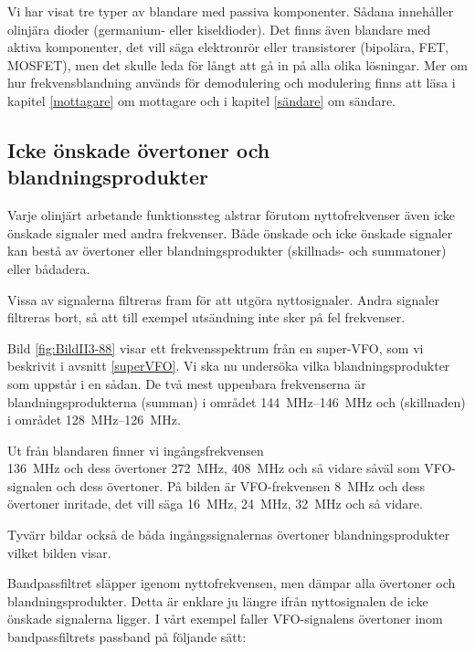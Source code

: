 Vi har visat tre typer av blandare med passiva komponenter.
Sådana innehåller olinjära dioder (germanium- eller kiseldioder).
Det finns även blandare med aktiva komponenter, det vill säga elektronrör eller
transistorer (bipolära, FET, MOSFET), men det skulle leda för långt
att gå in på alla olika lösningar.
Mer om hur frekvensblandning används för demodulering och modulering finns att
läsa i kapitel \ref{mottagare} om mottagare och i kapitel \ref{sändare} om
sändare.

\subsection{Icke önskade övertoner och blandningsprodukter}

Varje olinjärt arbetande funktionssteg alstrar förutom nyttofrekvenser
även icke önskade signaler med andra frekvenser.
Både önskade och icke önskade signaler kan bestå av övertoner eller
blandningsprodukter (skillnads- och summatoner) eller bådadera.

Vissa av signalerna filtreras fram för att utgöra nyttosignaler.
Andra signaler filtreras bort, så att till exempel utsändning inte sker på fel
frekvenser.


Bild \ref{fig:BildII3-88} visar ett frekvensspektrum från en super-VFO, som vi
beskrivit i avsnitt \ref{superVFO}.
Vi ska nu undersöka vilka blandningsprodukter som uppstår i en sådan.
De två mest uppenbara frekvenserna är blandningsprodukterna (summan) i området
\SIrange{144}{146}{\mega\hertz} och (skillnaden) i området
\SIrange{128}{126}{\mega\hertz}.

Ut från blandaren finner vi ingångsfrekvensen \\ \SI{136}{\mega\hertz} och dess
övertoner \SI{272}{\mega\hertz}, \SI{408}{\mega\hertz} och så vidare såväl som
VFO-signalen och dess övertoner.
På bilden är VFO-frekvensen \SI{8}{\mega\hertz} och dess övertoner inritade, det
vill säga \SI{16}{\mega\hertz}, \SI{24}{\mega\hertz}, \SI{32}{\mega\hertz} och
så vidare.

Tyvärr bildar också de båda ingångssignalernas övertoner
blandningsprodukter vilket bilden visar.

Bandpassfiltret släpper igenom nyttofrekvensen, men dämpar alla övertoner och
blandningsprodukter.
Detta är enklare ju längre ifrån nyttosignalen de icke önskade signalerna
ligger.
I vårt exempel faller VFO-signalens övertoner inom bandpassfiltrets passband
på följande sätt:

